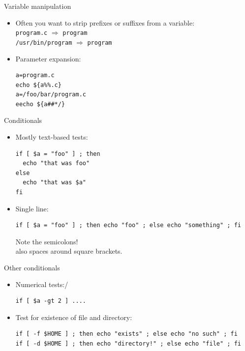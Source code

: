 \documentclass[11pt,headernav]{beamer}
\begin{document}
\begin{numberedframe}{Variable manipulation}
  \begin{itemize}
  \item Often you want to strip prefixes or suffixes from a variable:\\
    \lstinline{program.c} $\Rightarrow$ \lstinline{program}\\
    \lstinline{/usr/bin/program} $\Rightarrow$ \lstinline{program}
  \item Parameter expansion:
\begin{lstlisting}
a=program.c
echo ${a%%.c}
a=/foo/bar/program.c
eecho ${a##*/}
\end{lstlisting}
  \end{itemize}
\end{numberedframe}

\begin{numberedframe}{Conditionals}
  \label{sl-lnx:if}
\begin{itemize}
  \item Mostly text-based tests:
\begin{lstlisting}
if [ $a = "foo" ] ; then
  echo "that was foo"
else
  echo "that was $a"
fi
\end{lstlisting}
\item Single line:
{  \footnotesize
\begin{lstlisting}
if [ $a = "foo" ] ; then echo "foo" ; else echo "something" ; fi
\end{lstlisting}
}
Note the semicolons!\\
also spaces around square brackets.
  \end{itemize}
\end{numberedframe}

\begin{numberedframe}{Other conditionals}
  \begin{itemize}
\item Numerical tests:/
\begin{lstlisting}
if [ $a -gt 2 ] ....
\end{lstlisting}
\item Test for existence of file and directory:
{ \footnotesize
\begin{lstlisting}
if [ -f $HOME ] ; then echo "exists" ; else echo "no such" ; fi
if [ -d $HOME ] ; then echo "directory!" ; else echo "file" ; fi
\end{lstlisting}
}
  \end{itemize}
\end{numberedframe}
\end{document}
